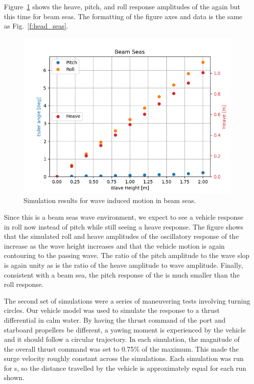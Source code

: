 \documentclass[utf8]{frontiersSCNS} %
\begin{document}
Figure~\ref{f:beam_seas} shows the heave, pitch, and roll response amplitudes of the \wamv{} again but this time for beam seas. The formatting of the figure axes and data is the same as Fig.~\ref{f:head_seas}.%
%
\begin{figure}[h]
  \centering
  \includegraphics[width=\SFc\textwidth]{images/2020_08_25_beam_seas_001.png}
  \caption{Simulation results for wave induced motion in beam seas.}
  \label{f:beam_seas}
\end{figure}
%
Since this is a beam seas wave environment, we expect to see a vehicle response in roll now instead of pitch while still seeing a heave response. The figure shows that the simulated roll and heave amplitudes of the oscillatory response of the \wamv{} increase as the wave height increases and that the vehicle motion is again contouring to the passing wave. The ratio of the pitch amplitude to the wave slop is again unity as is the ratio of the heave amplitude to wave amplitude. Finally, consistent with a beam sea, the pitch response of the \wamv{} is much smaller than the roll response.

The second set of simulations were a series of maneuvering tests involving turning circles. Our vehicle model was used to simulate the \wamv{} response to a thrust differential in calm water. By having the thrust command of the port and starboard propellers be different, a yawing moment is experienced by the vehicle and it should follow a circular trajectory. In each simulation, the magnitude of the overall thrust command was set to 0.75\% of the maximum. This made the surge velocity roughly constant across the simulations. Each simulation was run for \unit[60]{s}, so the distance travelled by the vehicle is approximately equal for each run shown.
\end{document}
